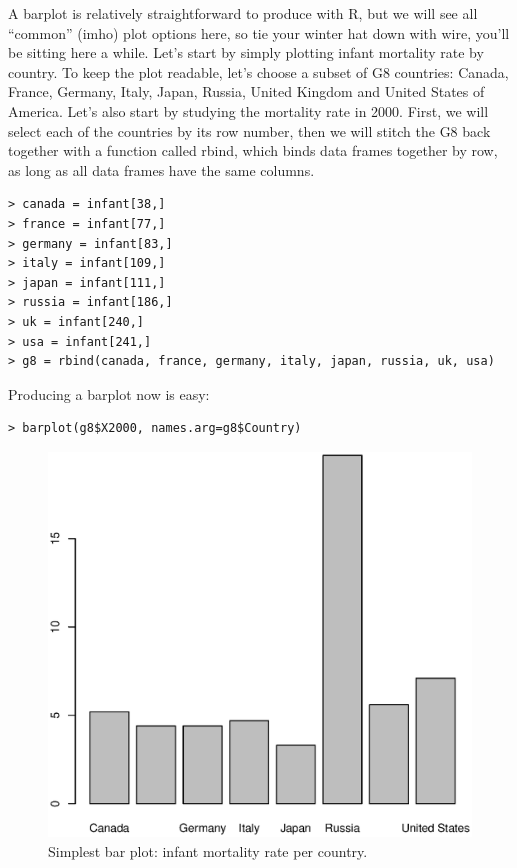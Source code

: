 \documentclass{report}
\newcommand{\code}[1]{\textsf{\ttfamily #1}}
\begin{document}
	A barplot is relatively straightforward to produce with R, but we will see all ``common'' (imho) plot options here, so tie your winter hat down with wire, you'll be sitting here a while.  Let's start by simply plotting infant mortality rate by country. To keep the plot readable, let's choose a subset of G8 countries: Canada, France, Germany, Italy, Japan, Russia, United Kingdom and United States of America. Let's also start by studying the mortality rate in 2000. First, we will select each of the countries by its row number, then we will stitch the G8 back together with a function called \code{rbind}, which binds data frames together by row, as long as all data frames have the same columns.
	\begin{verbatim}
> canada = infant[38,]
> france = infant[77,]
> germany = infant[83,]
> italy = infant[109,]
> japan = infant[111,]
> russia = infant[186,]
> uk = infant[240,]
> usa = infant[241,]
> g8 = rbind(canada, france, germany, italy, japan, russia, uk, usa)
	 \end{verbatim}

	Producing a barplot now is easy:
	\begin{verbatim}
> barplot(g8$X2000, names.arg=g8$Country)
	\end{verbatim}
	\begin{figure}[h]
		\centering
		\includegraphics[width=1.0\textwidth]{barsimple.eps}
		\caption{Simplest bar plot: infant mortality rate per country.}
	\label{fig:simplebar}
	\end{figure}
\end{document}
